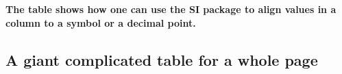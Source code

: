 \textbf{The table shows how one can use the SI package to align values in a column to a symbol or a decimal point. }



\subsection{A giant complicated table for a whole page}

\lipsum[61]


\begingroup
\renewcommand*{\arraystretch}{1.4}

\begin{table}
	\centering
	\caption{Summary of the used annealing methods describing their characteristics in the context of oxide reduction experiments.}
	\label{annealing-summary}
\end{table}
